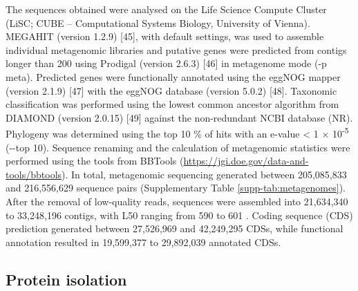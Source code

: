 \documentclass[
  12 pt,
]{article}
\begin{document}
The sequences obtained were analysed on the Life Science Compute Cluster (LiSC; CUBE -- Computational Systems Biology, University of Vienna). MEGAHIT (version 1.2.9) {[}45{]}, with default settings, was used to assemble individual metagenomic libraries and putative genes were predicted from contigs longer than 200 \si{\bp} using Prodigal (version 2.6.3) {[}46{]} in metagenome mode (-p meta). Predicted genes were functionally annotated using the eggNOG mapper (version 2.1.9) {[}47{]} with the eggNOG database (version 5.0.2) {[}48{]}. Taxonomic classification was performed using the lowest common ancestor algorithm from DIAMOND (version 2.0.15) {[}49{]} against the non-redundant NCBI database (NR). Phylogeny was determined using the top 10 \si{\percent} of hits with an e-value \textless{} 1 × 10\textsuperscript{-5} (-\/-top 10). Sequence renaming and the calculation of metagenomic statistics were performed using the tools from BBTools (\url{https://jgi.doe.gov/data-and-tools/bbtools}). In total, metagenomic sequencing generated between 205,085,833 and 216,556,629 sequence pairs (Supplementary Table \ref{supp-tab:metagenomes}). After the removal of low-quality reads, sequences were assembled into 21,634,340 to 33,248,196 contigs, with L50 ranging from 590 to 601 \si{\bp}. Coding sequence (CDS) prediction generated between 27,526,969 and 42,249,295 CDSs, while functional annotation resulted in 19,599,377 to 29,892,039 annotated CDSs.

\hypertarget{protein-isolation}{%
\subsection{Protein isolation}\label{protein-isolation}}
\end{document}
